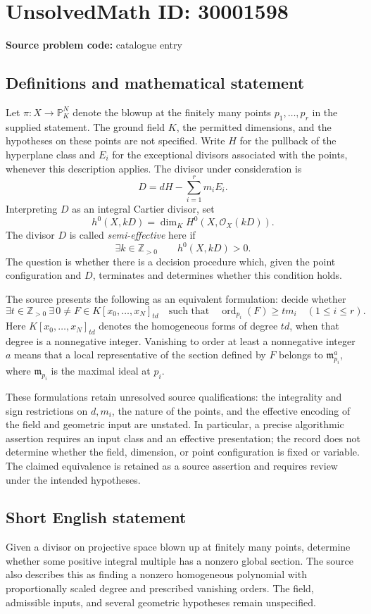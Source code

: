 \documentclass[11pt]{article}
\begin{document}
\section*{UnsolvedMath ID: 30001598}
\textbf{Source problem code:} catalogue entry
\subsection{Definitions and mathematical statement}
Let \(\pi\colon X\to\mathbb P^N_K\) denote the blowup at the finitely many points \(p_1,\ldots,p_r\) in the supplied statement. The ground field \(K\), the permitted dimensions, and the hypotheses on these points are not specified. Write \(H\) for the pullback of the hyperplane class and \(E_i\) for the exceptional divisors associated with the points, whenever this description applies. The divisor under consideration is
\[
D=dH-\sum_{i=1}^{r}m_iE_i.
\]
Interpreting \(D\) as an integral Cartier divisor, set
\[
h^0(X,kD)=\dim_K H^0\!\left(X,\mathcal O_X(kD)\right).
\]
The divisor \(D\) is called \emph{semi-effective} here if
\[
\exists k\in\mathbb Z_{>0}\qquad h^0(X,kD)>0.
\]
The question is whether there is a decision procedure which, given the point configuration and \(D\), terminates and determines whether this condition holds.

The source presents the following as an equivalent formulation: decide whether
\[
\exists t\in\mathbb Z_{>0}\ \exists\,0\ne F\in K[x_0,\ldots,x_N]_{td}
\quad\text{such that}\quad
\operatorname{ord}_{p_i}(F)\ge tm_i
\quad(1\le i\le r).
\]
Here \(K[x_0,\ldots,x_N]_{td}\) denotes the homogeneous forms of degree \(td\), when that degree is a nonnegative integer. Vanishing to order at least a nonnegative integer \(a\) means that a local representative of the section defined by \(F\) belongs to \(\mathfrak m_{p_i}^{a}\), where \(\mathfrak m_{p_i}\) is the maximal ideal at \(p_i\).

These formulations retain unresolved source qualifications: the integrality and sign restrictions on \(d,m_i\), the nature of the points, and the effective encoding of the field and geometric input are unstated. In particular, a precise algorithmic assertion requires an input class and an effective presentation; the record does not determine whether the field, dimension, or point configuration is fixed or variable. The claimed equivalence is retained as a source assertion and requires review under the intended hypotheses.
\subsection{Short English statement}
Given a divisor on projective space blown up at finitely many points, determine whether some positive integral multiple has a nonzero global section. The source also describes this as finding a nonzero homogeneous polynomial with proportionally scaled degree and prescribed vanishing orders. The field, admissible inputs, and several geometric hypotheses remain unspecified.
\end{document}
